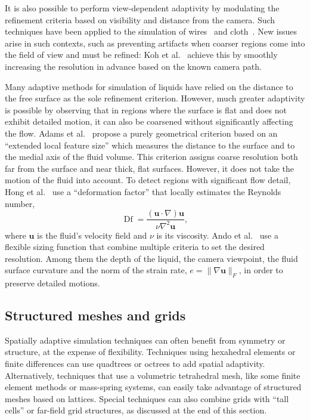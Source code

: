It is also possible to perform view-dependent adaptivity by modulating the refinement criteria based on visibility and distance from the camera. Such techniques have been applied to the simulation of wires~\cite{Servin2008} and cloth~\cite{Koh2014}. New issues arise in such contexts, such as preventing artifacts when coarser regions come into the field of view and must be refined: Koh et al.~\cite{Koh2014} achieve this by smoothly increasing the resolution in advance based on the known camera path.

Many adaptive methods for simulation of liquids have relied on the distance to the free surface as the sole refinement criterion.
However, much greater adaptivity is possible by observing that in regions where the surface is flat and does not exhibit detailed motion, it can also be coarsened without significantly affecting the flow.
Adams et al.~\cite{Adams2007} propose a purely geometrical criterion based on an ``extended local feature size'' which measures the distance to the surface and to the medial axis of the fluid volume.
This criterion assigns coarse resolution both far from the surface and near thick, flat surfaces.
However, it does not take the motion of the fluid into account.
To detect regions with significant flow detail, Hong et al.~\cite{Hong2008FLIP} use a ``deformation factor'' that locally estimates the Reynolds number,
\begin{equation}
  \operatorname{Df} = \frac{(\mathbf u\cdot\nabla)\mathbf u}{\nu\nabla^2\mathbf u},
\end{equation}
where $\mathbf u$ is the fluid's velocity field and $\nu$ is its viscosity.
Ando et al.~\cite{Ando2013} use a flexible sizing function that combine multiple criteria to set the desired resolution. Among them the depth of the liquid, the camera viewpoint, the fluid surface curvature and the norm of the strain rate, $e = \|\nabla\mathbf u\|_F$, in order to preserve detailed motions.

\subsection{Structured meshes and grids}

\label{sec:structured}
Spatially adaptive simulation techniques can often benefit from symmetry or structure, at the expense of flexibility. Techniques using hexahedral elements or finite differences can use quadtrees or octrees to add spatial adaptivity. Alternatively, techniques that use a volumetric tetrahedral mesh, like some finite element methods or mass-spring systems, can easily take advantage of structured meshes based on lattices. Special techniques can also combine grids with ``tall cells'' or far-field grid structures, as discussed at the end of this section.

